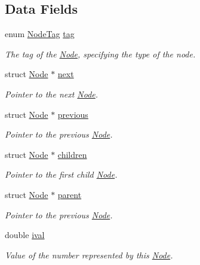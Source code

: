 \subsection*{Data Fields}
\begin{DoxyCompactItemize}
\item 
enum \hyperlink{node_8h_a83ba1e84fa23f6619c3d29036b160919}{Node\-Tag} \hyperlink{structNode_aae55c9a8e76121d7f9c721c0239e6fb8}{tag}
\begin{DoxyCompactList}\small\item\em The tag of the \hyperlink{structNode}{Node}, specifying the type of the node. \end{DoxyCompactList}\item 
struct \hyperlink{structNode}{Node} $\ast$ \hyperlink{structNode_aa162dd1e0693188a22b1f13b9a2a0ef0}{next}
\begin{DoxyCompactList}\small\item\em Pointer to the next \hyperlink{structNode}{Node}. \end{DoxyCompactList}\item 
struct \hyperlink{structNode}{Node} $\ast$ \hyperlink{structNode_a9a9311efc5dc64017bf492a386b77b0d}{previous}
\begin{DoxyCompactList}\small\item\em Pointer to the previous \hyperlink{structNode}{Node}. \end{DoxyCompactList}\item 
struct \hyperlink{structNode}{Node} $\ast$ \hyperlink{structNode_a827ac726d02ddf6d00ba8a55cd296df2}{children}
\begin{DoxyCompactList}\small\item\em Pointer to the first child \hyperlink{structNode}{Node}. \end{DoxyCompactList}\item 
struct \hyperlink{structNode}{Node} $\ast$ \hyperlink{structNode_a7b739036012f282683e6452a0b1595af}{parent}
\begin{DoxyCompactList}\small\item\em Pointer to the previous \hyperlink{structNode}{Node}. \end{DoxyCompactList}\item 
double \hyperlink{structNode_ad7f9455e819b623c0e4a9480476eacfe}{ival}
\begin{DoxyCompactList}\small\item\em Value of the number represented by this \hyperlink{structNode}{Node}. \end{DoxyCompactList}\item 

\end{DoxyCompactItemize}
